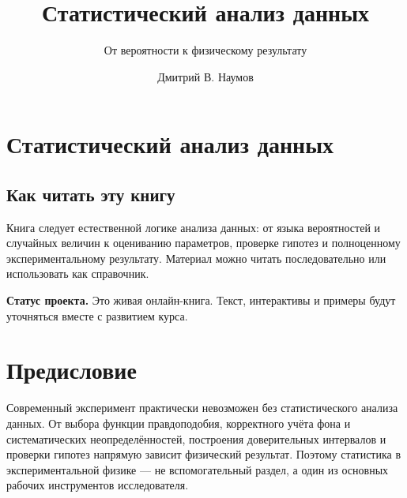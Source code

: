 \documentclass[
  russian,
  letterpaper,
]{scrbook}
\title{Статистический анализ данных}
\subtitle{От вероятности к физическому результату}
\author{Дмитрий В. Наумов}
\date{}
\begin{document}
\frontmatter
\maketitle


\mainmatter
{}

\chapter*{Статистический анализ
данных}\label{ux441ux442ux430ux442ux438ux441ux442ux438ux447ux435ux441ux43aux438ux439-ux430ux43dux430ux43bux438ux437-ux434ux430ux43dux43dux44bux445}


\section*{Как читать эту
книгу}\label{ux43aux430ux43a-ux447ux438ux442ux430ux442ux44c-ux44dux442ux443-ux43aux43dux438ux433ux443}


Книга следует естественной логике анализа данных: от языка вероятностей
и случайных величин к оцениванию параметров, проверке гипотез и
полноценному экспериментальному результату. Материал можно читать
последовательно или использовать как справочник.

\textbf{Статус проекта.} Это живая онлайн-книга. Текст, интерактивы и
примеры будут уточняться вместе с развитием курса.


\chapter*{Предисловие}\label{ux43fux440ux435ux434ux438ux441ux43bux43eux432ux438ux435}


Современный эксперимент практически невозможен без статистического
анализа данных. От выбора функции правдоподобия, корректного учёта фона
и систематических неопределённостей, построения доверительных интервалов
и проверки гипотез напрямую зависит физический результат. Поэтому
статистика в экспериментальной физике --- не вспомогательный раздел, а
один из основных рабочих инструментов исследователя.
\end{document}
